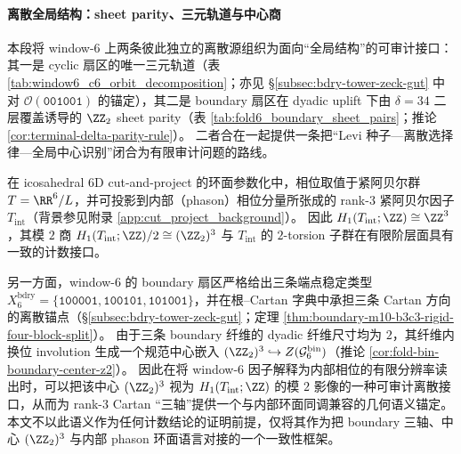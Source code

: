 \paragraph{离散全局结构：sheet parity、三元轨道与中心商}\label{par:bdry-tower-global-sheet-z6}
本段将 window-\(6\) 上两条彼此独立的离散源组织为面向“全局结构”的可审计接口：其一是 cyclic 扇区的唯一三元轨道（表 \ref{tab:window6_c6_orbit_decomposition}；亦见 \S\ref{subsec:bdry-tower-zeck-gut} 中对 \(\mathcal{O}(\texttt{001001})\) 的锚定），其二是 boundary 扇区在 dyadic uplift 下由 \(\delta=34\) 二层覆盖诱导的 \(\ZZ_2\) sheet parity（表 \ref{tab:fold6_boundary_sheet_pairs}；推论 \ref{cor:terminal-delta-parity-rule}）。
二者合在一起提供一条把“Levi 种子—离散选择律—全局中心识别”闭合为有限审计问题的路线。



\begin{remark}\label{rem:bdry-tint-h1-cartan-anchor}
在 icosahedral 6D cut-and-project 的环面参数化中，相位取值于紧阿贝尔群 \(T=\RR^6/L\)，并可投影到内部（phason）相位分量所张成的 rank-\(3\) 紧阿贝尔因子 \(T_{\mathrm{int}}\)（背景参见附录 \ref{app:cut_project_background}）。
因此
\(
H_1(T_{\mathrm{int}};\ZZ)\cong \ZZ^3
\)，其模 \(2\) 商
\(
H_1(T_{\mathrm{int}};\ZZ)/2\cong (\ZZ_2)^3
\)
与 \(T_{\mathrm{int}}\) 的 \(2\)-torsion 子群在有限阶层面具有一致的计数接口。
\par
另一方面，window-\(6\) 的 boundary 扇区严格给出三条端点稳定类型
\(
X_6^{\mathrm{bdry}}=\{\texttt{100001},\texttt{100101},\texttt{101001}\}
\)，并在根--Cartan 字典中承担三条 Cartan 方向的离散锚点（\S\ref{subsec:bdry-tower-zeck-gut}；定理 \ref{thm:boundary-m10-b3c3-rigid-four-block-split}）。
由于三条 boundary 纤维的 dyadic 纤维尺寸均为 \(2\)，其纤维内换位 involution 生成一个规范中心嵌入 \((\ZZ_2)^3\hookrightarrow Z(\mathcal{G}^{\mathrm{bin}}_6)\)（推论 \ref{cor:fold-bin-boundary-center-z2}）。
因此在将 window-\(6\) 因子解释为内部相位的有限分辨率读出时，可以把该中心 \((\ZZ_2)^3\) 视为 \(H_1(T_{\mathrm{int}};\ZZ)\) 的模 \(2\) 影像的一种可审计离散接口，从而为 rank-\(3\) Cartan “三轴”提供一个与内部环面同调兼容的几何语义锚定。
本文不以此语义作为任何计数结论的证明前提，仅将其作为把 boundary 三轴、中心 \((\ZZ_2)^3\) 与内部 phason 环面语言对接的一个一致性框架。
\end{remark}

